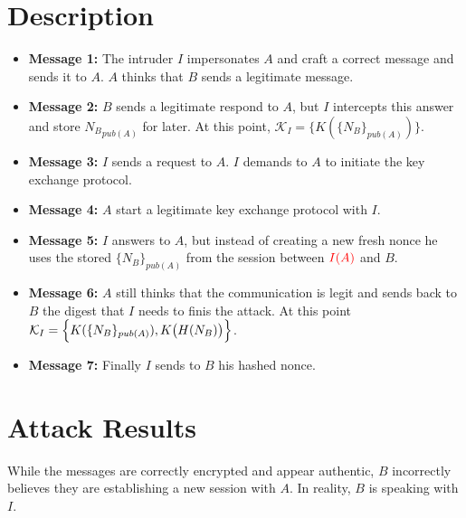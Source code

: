 \documentclass[11pt]{article}
\begin{document}
    \section{Description}
    \begin{itemize}
        \item \textbf{Message 1:} The intruder $I$ impersonates $A$ and craft a correct message and sends it to $A$. $A$
        thinks that $B$ sends a legitimate message.

        \item \textbf{Message 2:} $B$ sends a legitimate respond to $A$, but $I$ intercepts this answer and store
        ${N_B}_{pub(A)}$ for later. At this point, $\mathcal{K}_I = \bigl\{K(\{N_B\}_{pub(A)})\bigr\}$.

        \item \textbf{Message 3:} $I$ sends a request to $A$. $I$ demands to $A$ to initiate the key exchange protocol.

        \item \textbf{Message 4:} $A$ start a legitimate key exchange protocol with $I$.

        \item \textbf{Message 5:} $I$ answers to $A$, but instead of creating a new fresh nonce he uses the stored $\{N_B\}_{pub(A)}$
        from the session between $\textcolor{red}{I(A)}$ and $B$.

        \item \textbf{Message 6:} $A$ still thinks that the communication is legit and sends back to $B$ the digest
        that $I$ needs to finis the attack. At this point $\mathcal{K}_I =\Bigl\{K(\{N_B\}_{pub(A)}), K\bigl(H(N_B)\bigr)\Bigr\} $.

        \item \textbf{Message 7:} Finally $I$ sends to $B$ his hashed nonce.
    \end{itemize}

    \section{Attack Results}
    While the messages are correctly encrypted and appear authentic, $B$ incorrectly believes they are establishing a new session with $A$. In reality, $B$ is speaking with $I$.
\end{document}
